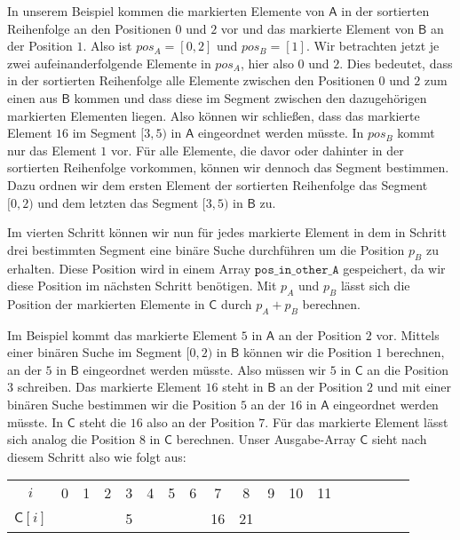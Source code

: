 In unserem Beispiel kommen die markierten Elemente von $\mathsf{A}$ in der sortierten Reihenfolge an den Positionen $0$ und $2$ vor und das markierte Element von $\mathsf{B}$ an der Position $1$. Also ist $pos_A = [0,2]$ und $pos_B = [1]$. Wir betrachten jetzt je zwei aufeinanderfolgende Elemente in $pos_A$, hier also $0$ und $2$. Dies bedeutet, dass in der sortierten Reihenfolge alle Elemente zwischen den Positionen $0$ und $2$ zum einen aus $\mathsf{B}$ kommen und dass diese im Segment zwischen den dazugehörigen markierten Elementen liegen. Also können wir schließen, dass das markierte Element $16$ im Segment $[3, 5)$ in $\mathsf{A}$ eingeordnet werden müsste. In $pos_B$ kommt nur das Element $1$ vor. Für alle Elemente, die davor oder dahinter in der sortierten Reihenfolge vorkommen, können wir dennoch das Segment bestimmen. Dazu ordnen wir dem ersten Element der sortierten Reihenfolge das Segment $[0,2)$ und dem letzten das Segment $[3,5)$ in $\mathsf{B}$ zu.

Im vierten Schritt können wir nun für jedes markierte Element in dem in Schritt drei bestimmten Segment eine binäre Suche durchführen um die Position $p_B$ zu erhalten. Diese Position wird in einem Array $\texttt{pos\_in\_other\_A}$ gespeichert, da wir diese Position im nächsten Schritt benötigen. Mit $p_A$ und $p_B$ lässt sich die Position der markierten Elemente in $\mathsf{C}$ durch $p_A+p_B$ berechnen. \par
Im Beispiel kommt das markierte Element $5$ in $\mathsf{A}$ an der Position $2$ vor. Mittels einer binären Suche im Segment $[0,2)$ in $\mathsf{B}$ können wir die Position $1$ berechnen, an der $5$ in $\mathsf{B}$ eingeordnet werden müsste. Also müssen wir $5$ in $\mathsf{C}$ an die Position $3$ schreiben. Das markierte Element $16$ steht in $\mathsf{B}$ an der Position $2$ und mit einer binären Suche bestimmen wir die Position $5$ an der $16$ in $\mathsf{A}$ eingeordnet werden müsste. In $\mathsf{C}$ steht die $16$ also an der Position $7$. Für das markierte Element lässt sich analog die Position $8$ in $\mathsf{C}$ berechnen. Unser Ausgabe-Array $\mathsf{C}$ sieht nach diesem Schritt also wie folgt aus:

\begin{table}[H]
	\small
	\centering
	\begin{tabular}{c| c c c c c c c c c c c c c c c c c}
		$i$ & 0 & 1 & 2 & 3 & 4 & 5 & 6 & 7 & 8 & 9 & 10 & 11 \\
		$\mathsf{C}[i]$ & & & & 5 & & & & 16 & 21 & & & & \\
	\end{tabular}
\end{table}


